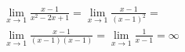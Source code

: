 \begin{ex}
\begin{align}
&\lim_{x\rightarrow 1} \frac{x-1}{x^2-2x+1}=\lim_{x\rightarrow 1} \frac{x-1}{(x-1)^2}=\nonumber\\
&\lim_{x\rightarrow 1} \frac{x-1}{(x-1)(x-1)}=\lim_{x\rightarrow 1} \frac{1}{x-1}=\infty\nonumber
\end{align}
\end{ex}